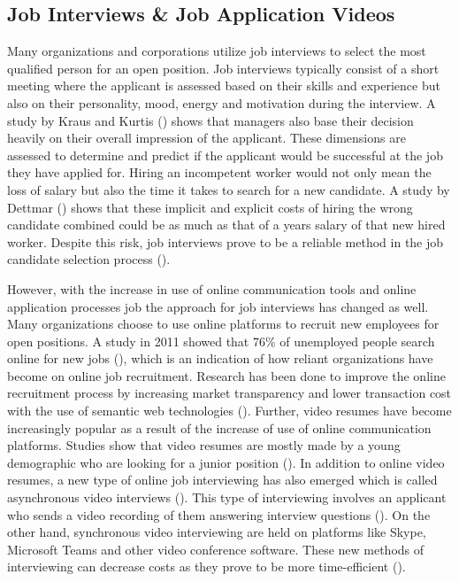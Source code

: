 \subsection{Job Interviews \& Job Application Videos}
Many organizations and corporations utilize job interviews to select the most qualified person for an open position. Job interviews typically consist of a short meeting where the applicant is assessed based on their skills and experience but also on their personality, mood, energy and motivation during the interview. A study by Kraus and Kurtis (\citeyear{kraus1990creative}) shows that managers also base their decision heavily on their overall impression of the applicant. These dimensions are assessed to determine and predict if the applicant would be successful at the job they have applied for. Hiring an incompetent worker would not only mean the loss of salary but also the time it takes to search for a new candidate. A study by Dettmar (\citeyear{dettmar2004we}) shows that these implicit and explicit costs of hiring the wrong candidate combined could be as much as that of a years salary of that new hired worker. Despite this risk, job interviews prove to be a reliable method in the job candidate selection process (\cite{weekley1987reliability}). 

However, with the increase in use of online communication tools and online application processes job the approach for job interviews has changed as well. Many organizations choose to use online platforms to recruit new employees for open positions. A study in 2011 showed that 76\% of unemployed people search online for new jobs (\cite{faberman2016does}), which is an indication of how reliant organizations have become on online job recruitment. Research has been done to improve the online recruitment process by increasing market transparency and lower transaction cost with the use of semantic web technologies (\cite{bizer2005impact}). Further, video resumes have become increasingly popular as a result of the increase of use of online communication platforms. Studies show that video resumes are mostly made by a young demographic who are looking for a junior position (\cite{nguyen2016hirability}). In addition to online video resumes, a new type of online job interviewing has also emerged which is called asynchronous video interviews (\cite{torres2017asynchronous}). This type of interviewing involves an applicant who sends a video recording of them answering interview questions (\cite{toldi2011jobapplicants}). On the other hand, synchronous video interviewing are held on platforms like Skype, Microsoft Teams and other video conference software. These new methods of interviewing can decrease costs as they prove to be more time-efficient (\cite{weber2012your}).

